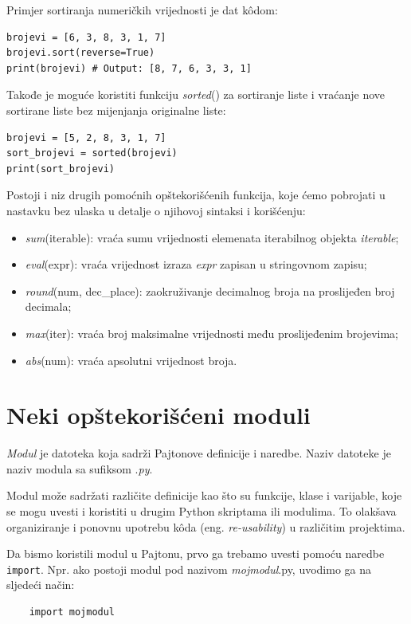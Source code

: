 Primjer sortiranja numeričkih vrijednosti je dat k\^odom:
\begin{verbatim}
brojevi = [6, 3, 8, 3, 1, 7]
brojevi.sort(reverse=True)
print(brojevi) # Output: [8, 7, 6, 3, 3, 1]
\end{verbatim}
  Takođe je moguće koristiti funkciju \textit{sorted}() za sortiranje liste i vraćanje nove sortirane liste bez mijenjanja originalne liste:
\begin{verbatim}
brojevi = [5, 2, 8, 3, 1, 7]
sort_brojevi = sorted(brojevi)
print(sort_brojevi)
\end{verbatim}

Postoji i niz drugih pomoćnih opštekorišćenih funkcija, koje ćemo pobrojati u nastavku bez ulaska u detalje o njihovoj sintaksi i korišćenju:
\begin{itemize}
	\item \textit{sum}(iterable): vraća sumu vrijednosti elemenata iterabilnog objekta \emph{iterable};
	\item \textit{eval}(expr): vraća vrijednost izraza \emph{expr} zapisan u stringovnom zapisu;
	\item \textit{round}(num, dec\_place): zaokruživanje decimalnog broja na proslijeđen broj decimala;
	\item \textit{max}(iter): vraća broj maksimalne vrijednosti među proslijeđenim brojevima;
	\item \textit{abs}(num): vraća apsolutni vrijednost broja. 
\end{itemize}
\section{Neki opštekorišćeni moduli}

\textit{Modul} je datoteka koja sadrži Pajtonove definicije i naredbe. Naziv datoteke je naziv modula sa sufiksom .\textit{py}.

Modul može sadržati različite definicije kao što su funkcije, klase i varijable, koje se mogu uvesti i koristiti u drugim Python skriptama ili modulima. To olakšava organiziranje i ponovnu upotrebu k\^oda (eng. \emph{re-usability}) u različitim projektima.

Da bismo koristili modul u Pajtonu, prvo ga trebamo uvesti pomoću naredbe \texttt{import}. Npr. ako postoji modul pod nazivom \textit{mojmodul}.py, uvodimo  ga na sljedeći način:
\begin{verbatim}
	import mojmodul
\end{verbatim}


